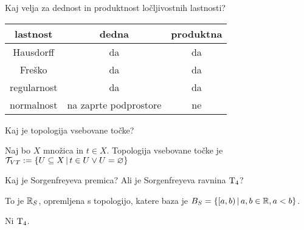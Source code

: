\begin{vo}{Kaj velja za dednost in produktnost ločljivostnih lastnosti?}

\begin{table}[h!]
\centering
\begin{tabular}{|c|c|c|}
\hline
lastnost       & dedna                 & produktna \\
\hline
Hausdorff      & da                     & da         \\
Freško         & da                     & da         \\
regularnost    & da                     & da         \\
normalnost     & na zaprte podprostore & ne         \\
\hline
\end{tabular}
\end{table}


\end{vo}

\begin{vo}{Kaj je topologija vsebovane točke?}

Naj bo $X$ množica in $t \in X$. Topologija vsebovane točke je
$\mathcal{T}_{VT} := \{ U \subseteq X \,|\, t \in U \lor U = \varnothing \}$

\end{vo}

\begin{vo}{Kaj je Sorgenfreyeva premica? Ali je Sorgenfreyeva ravnina $\text{T}_{4}$?}

To je $\mathbb{R}_S$, opremljena s topologijo, katere baza je
$B_S = \{[a, b) \,|\, a,b \in \mathbb{R}, a < b\}$.

Ni $\text{T}_{4}$.

\end{vo}
